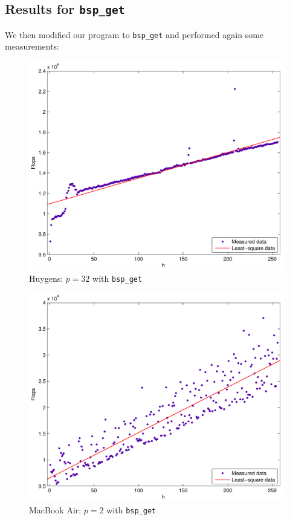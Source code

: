 \documentclass[a4paper,11pt]{article}
\begin{document}
\subsection*{Results for \texttt{bsp\_get} }

We then modified our program to \texttt{bsp\_get} and performed again some measurements:


\begin{figure}[H]
\begin{center}
\includegraphics[scale=0.6]{img/32-get}
\end{center}
\caption{Huygens: $p=32$ with \texttt{bsp\_get}}\label{huy:32}
\end{figure}

\begin{figure}[H]
\begin{center}
\includegraphics[scale=0.6]{img/mb-2-get}
\end{center}
\caption{MacBook Air: $p=2$ with \texttt{bsp\_get}} \label{mb:2}
\end{figure}
\end{document}
